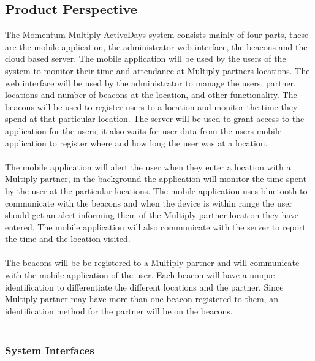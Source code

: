 \documentclass[11pt]{article}
\begin{document}
\subsection{Product Perspective}
The Momentum Multiply ActiveDays system consists mainly of four parts, these are the mobile application, the administrator web interface, the beacons and the cloud based server. The mobile application will be used by the users of the system to monitor their time and attendance at Multiply partners locations. The web interface will be used by the administrator to manage the users, partner, locations and number of beacons at the location, and other functionality. The beacons will be used to register users to a location and monitor the time they spend at that particular location. The server will be used to grant access to the application for the users, it also waits for user data from the users mobile application to register where and how long the user was at a location.\\\\
The mobile application will alert the user when they enter a location with a Multiply partner, in the background the application will monitor the time spent by the user at the particular locations. The mobile application uses bluetooth to communicate with the beacons and when the device is within range the user should get an alert informing them of the Multiply partner location they have entered. The mobile application will also communicate with the server to report the time and the location visited. \\\\
The beacons will be be registered to a Multiply partner and will communicate with the mobile application of the user. Each beacon will have a unique identification to differentiate the different locations and the partner. Since Multiply partner may have more than one beacon registered to them, an identification method for the partner will be on the beacons.\\\\
\subsubsection{System Interfaces}
\end{document}

